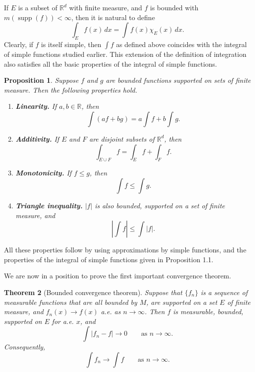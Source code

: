 \documentclass[11pt,openany]{book}
\newtheorem{theorem}{Theorem}[section]
\newtheorem{proposition}[theorem]{Proposition}
\begin{document}
If $E$ is a subset of $\mathbb{R}^d$ with finite measure, and $f$ is bounded with $m(\operatorname{supp}(f))<\infty$, then it is natural to define
\[
\int_E f(x)\,dx=\int f(x)\chi_E(x)\,dx.
\]
Clearly, if $f$ is itself simple, then $\int f$ as defined above coincides with the integral of simple functions studied earlier. This extension of the definition of integration also satisfies all the basic properties of the integral of simple functions.

\begin{proposition}
Suppose $f$ and $g$ are bounded functions supported on sets of finite measure. Then the following properties hold.
\begin{enumerate}
\item[(i)] \textbf{Linearity.} If $a,b\in\mathbb{R}$, then
\[
\int(af+bg)=a\int f+b\int g.
\]
\item[(ii)] \textbf{Additivity.} If $E$ and $F$ are disjoint subsets of $\mathbb{R}^d$, then
\[
\int_{E\cup F}f=\int_Ef+\int_Ff.
\]
\item[(iii)] \textbf{Monotonicity.} If $f\leq g$, then
\[
\int f\leq\int g.
\]
\item[(iv)] \textbf{Triangle inequality.} $|f|$ is also bounded, supported on a set of finite measure, and
\[
\left|\int f\right|\leq\int|f|.
\]
\end{enumerate}
\end{proposition}

All these properties follow by using approximations by simple functions, and the properties of the integral of simple functions given in Proposition 1.1.

We are now in a position to prove the first important convergence theorem.

\begin{theorem}[Bounded convergence theorem]
Suppose that $\{f_n\}$ is a sequence of measurable functions that are all bounded by $M$, are supported on a set $E$ of finite measure, and $f_n(x)\to f(x)$ a.e. as $n\to\infty$. Then $f$ is measurable, bounded, supported on $E$ for a.e. $x$, and
\[
\int|f_n-f|\to0\qquad\text{as }n\to\infty.
\]
Consequently,
\[
\int f_n\to\int f\qquad\text{as }n\to\infty.
\]
\end{theorem}
\end{document}

